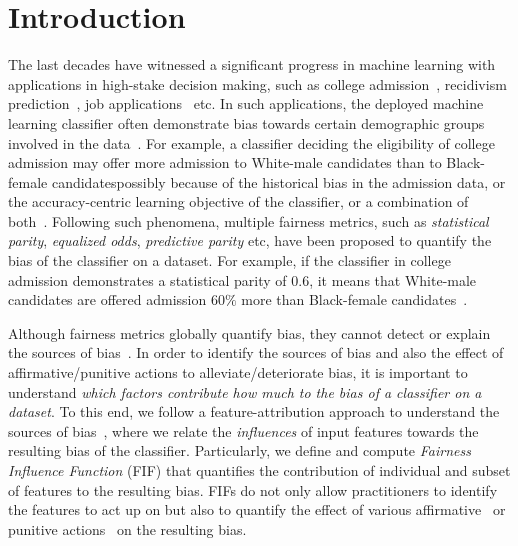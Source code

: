 \section{Introduction}
The last decades have witnessed a significant progress in machine learning with applications in high-stake decision making, such as college admission~\cite{martinez2021using}, recidivism prediction~\cite{tollenaar2013method}, job applications~\cite{ajunwa2016hiring} etc. In such applications, the deployed machine learning classifier often demonstrate bias towards certain demographic groups involved in the data~\cite{dwork2012fairness}. For example, a classifier deciding the eligibility of college admission may offer more admission to White-male candidates than to Black-female candidates\textemdash possibly because of the historical bias in the admission data, or the accuracy-centric learning objective of the classifier, or a combination of both~\cite{berk2019accuracy,landy1978correlates,zliobaite2015relation}. Following such phenomena, multiple fairness metrics, such as \textit{statistical parity}, \textit{equalized odds}, \textit{predictive parity} etc, have been proposed to quantify the bias of the classifier on a dataset. For example, if the classifier in college admission demonstrates a {statistical parity} of $ 0.6 $, it means that White-male candidates are offered admission $ 60\% $ more than Black-female candidates~\cite{besse2021survey,feldman2015certifying,garg2020fairness}.

Although fairness metrics globally quantify bias, they cannot detect or explain the sources of bias~\cite{begley2020explainability,lundberg2020explaining,pan2021explaining}. In order to identify the sources of bias and also the effect of affirmative/punitive actions to alleviate/deteriorate bias, it is important to understand \textit{which factors contribute how much to the bias of a classifier on a dataset}. To this end, we follow a feature-attribution approach to understand the sources of bias~\cite{begley2020explainability,lundberg2020explaining}, where we relate the \emph{influences} of input features towards the resulting bias of the classifier. Particularly, we define and compute \textit{Fairness Influence Function} (FIF) that quantifies the contribution of individual and subset of features to the resulting bias. FIFs do not only allow practitioners to identify the features to act up on but also to quantify the effect of various affirmative~\cite{calmon2017optimized,hardt2016equality,kamiran2012decision,zemel2013learning,zhang2018mitigating,zhang2018fairness,zhang2019faht} or punitive actions~\cite{hua2021human,mehrabi2020exacerbating,solans2020poisoning} on the resulting bias. 


